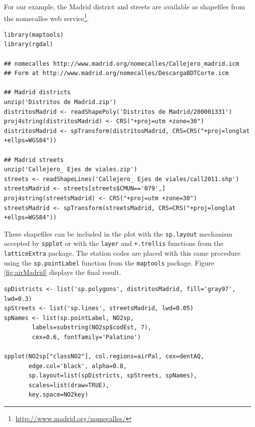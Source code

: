 \documentclass[smallroyalvopaper]{memoir}
\begin{document}
For our example, the Madrid district and streets are available as
shapefiles from the nomecalles web service\footnote{\url{http://www.madrid.org/nomecalles/}}.


\lstset{language=R,numbers=none}
\begin{lstlisting}
library(maptools)
library(rgdal)

## nomecalles http://www.madrid.org/nomecalles/Callejero_madrid.icm
## Form at http://www.madrid.org/nomecalles/DescargaBDTCorte.icm

## Madrid districts
unzip('Distritos de Madrid.zip')
distritosMadrid <- readShapePoly('Distritos de Madrid/200001331')
proj4string(distritosMadrid) <- CRS("+proj=utm +zone=30")
distritosMadrid <- spTransform(distritosMadrid, CRS=CRS("+proj=longlat +ellps=WGS84"))

## Madrid streets
unzip('Callejero_ Ejes de viales.zip')
streets <- readShapeLines('Callejero_ Ejes de viales/call2011.shp')
streetsMadrid <- streets[streets$CMUN=='079',]
proj4string(streetsMadrid) <- CRS("+proj=utm +zone=30")
streetsMadrid <- spTransform(streetsMadrid, CRS=CRS("+proj=longlat +ellps=WGS84"))
\end{lstlisting}

These shapefiles can be included in the plot with the \texttt{sp.layout}
mechanism accepted by \texttt{spplot} or with the \texttt{layer} and \texttt{+.trellis}
functions from the \texttt{latticeExtra} package. The station codes are
placed with this same procedure using the \texttt{sp.pointLabel} function
from the \texttt{maptools} package. Figure \ref{fig:airMadrid} displays the
final result.


\lstset{language=R,numbers=none}
\begin{lstlisting}
spDistricts <- list('sp.polygons', distritosMadrid, fill='gray97', lwd=0.3)
spStreets <- list('sp.lines', streetsMadrid, lwd=0.05)
spNames <- list(sp.pointLabel, NO2sp,
		labels=substring(NO2sp$codEst, 7),
		cex=0.6, fontfamily='Palatino')

spplot(NO2sp["classNO2"], col.regions=airPal, cex=dentAQ,
       edge.col='black', alpha=0.8,
       sp.layout=list(spDistricts, spStreets, spNames),
       scales=list(draw=TRUE),
       key.space=NO2key)
\end{lstlisting}
\end{document}
